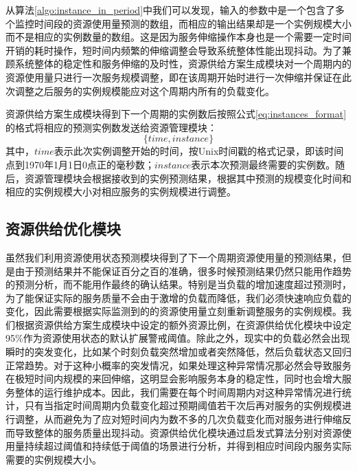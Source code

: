 从算法\ref{algo:instance_in_period}中我们可以发现，输入的参数中是一个包含了多个监控时间段的资源使用量预测的数组，而相应的输出结果却是一个实例规模大小而不是相应的实例数量的数组。这是因为服务伸缩操作本身也是一个需要一定时间开销的耗时操作，短时间内频繁的伸缩调整会导致系统整体性能出现抖动。为了兼顾系统整体的稳定性和服务伸缩的及时性，资源供给方案生成模块对一个周期内的资源使用量只进行一次服务规模调整，即在该周期开始时进行一次伸缩并保证在此次调整之后服务的实例规模能应对这个周期内所有的负载变化。

资源供给方案生成模块得到下一个周期的实例数后按照公式\ref{eq:instances_format}的格式将相应的预测实例数发送给资源管理模块：
\begin{equation}\label{eq:instances_format}
\{time, instance\}
\end{equation}
其中，$time$表示此次实例调整开始的时间，按Unix时间戳的格式记录，即该时间点到1970年1月1日0点正的毫秒数；$instance$表示本次预测最终需要的实例数。随后，资源管理模块会根据接收到的实例预测结果，根据其中预测的规模变化时间和相应的实例规模大小对相应服务的实例规模进行调整。

\subsection{资源供给优化模块}\label{sec:provision_react}
虽然我们利用资源使用状态预测模块得到了下一个周期资源使用量的预测结果，但是由于预测结果并不能保证百分之百的准确，很多时候预测结果仍然只能用作趋势的预测分析，而不能用作最终的确认结果。特别是当负载的增加速度超过预测时，为了能保证实际的服务质量不会由于激增的负载而降低，我们必须快速响应负载的变化，因此需要根据实际监测到的的资源使用量立刻重新调整服务的实例规模。我们根据资源供给方案生成模块中设定的额外资源比例，在资源供给优化模块中设定95\%作为资源使用状态的默认扩展警戒阈值。除此之外，现实中的负载必然会出现瞬时的突发变化，比如某个时刻负载突然增加或者突然降低，然后负载状态又回归正常趋势。对于这种小概率的突发情况，如果处理这种异常情况那必然会导致服务在极短时间内规模的来回伸缩，这明显会影响服务本身的稳定性，同时也会增大服务整体的运行维护成本。因此，我们需要在每个时间周期内对这种异常情况进行统计，只有当指定时间周期内负载变化超过预期阈值若干次后再对服务的实例规模进行调整，从而避免为了应对短时间内为数不多的几次负载变化而对服务进行伸缩反而导致整体的服务质量出现抖动。资源供给优化模块通过启发式算法分别对资源使用量持续超过阈值和持续低于阈值的场景进行分析，并得到相应时间段内服务实际需要的实例规模大小。

